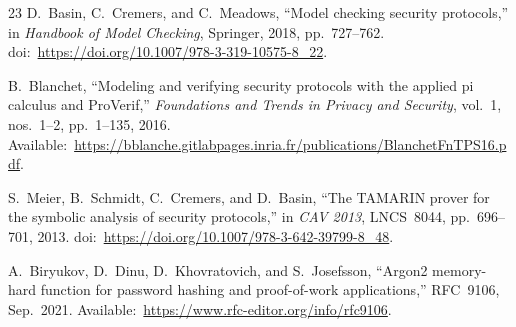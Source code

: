 \documentclass[conference]{IEEEtran}
\begin{document}
\begin{thebibliography}{23}
D.~Basin, C.~Cremers, and C.~Meadows, ``Model checking security protocols,'' in \emph{Handbook of Model Checking}, Springer, 2018, pp.~727--762. doi:~\url{https://doi.org/10.1007/978-3-319-10575-8_22}.

B.~Blanchet, ``Modeling and verifying security protocols with the applied pi calculus and ProVerif,'' \emph{Foundations and Trends in Privacy and Security}, vol.~1, nos.~1--2, pp.~1--135, 2016. Available:~\url{https://bblanche.gitlabpages.inria.fr/publications/BlanchetFnTPS16.pdf}.

S.~Meier, B.~Schmidt, C.~Cremers, and D.~Basin, ``The TAMARIN prover for the symbolic analysis of security protocols,'' in \emph{CAV 2013}, LNCS~8044, pp.~696--701, 2013. doi:~\url{https://doi.org/10.1007/978-3-642-39799-8_48}.

A.~Biryukov, D.~Dinu, D.~Khovratovich, and S.~Josefsson, ``Argon2 memory-hard function for password hashing and proof-of-work applications,'' RFC~9106, Sep.~2021. Available:~\url{https://www.rfc-editor.org/info/rfc9106}.

\end{thebibliography}
\end{document}
